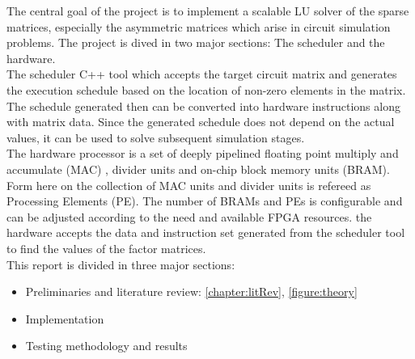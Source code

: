 The central goal of the project is to implement a scalable LU solver of the sparse matrices,
especially the asymmetric matrices which arise in circuit simulation problems. The 
project is dived in two major sections: The scheduler and the hardware.\\
The scheduler C++ tool which accepts the target circuit matrix and generates the 
execution schedule based on the location of non-zero elements in the matrix. The 
schedule generated then can be converted into hardware instructions along with 
matrix data. Since the generated schedule does not depend on the actual values, 
it can be used to solve subsequent simulation stages. \\
The hardware processor is a set of deeply pipelined floating point multiply and accumulate (MAC)
, divider units and on-chip block memory units (BRAM). Form here on the collection
of MAC units and divider units is refereed as Processing Elements (PE). The number of
BRAMs and PEs is configurable and can be adjusted according to the need and available
FPGA resources. the hardware accepts the data and instruction set generated 
from the scheduler tool to find the values of the factor matrices. \\
This report is divided in three major sections:
\begin{itemize}
    \item Preliminaries and literature review: \ref{chapter:litRev}, \ref{figure:theory}
    \item Implementation
    \item Testing methodology and results
\end{itemize} 


